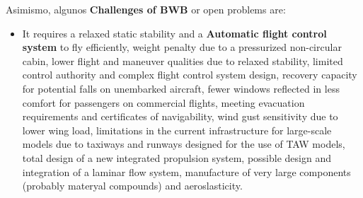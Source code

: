 %
Asimismo, algunos \textbf{Challenges of BWB} or open problems are:
\begin{itemize}
    \item It requires a relaxed static stability and a \textbf{Automatic flight control system} to fly efficiently, weight penalty due to a pressurized non-circular cabin, lower flight and maneuver qualities due to relaxed stability, limited control authority and complex flight control system design, recovery capacity for potential falls on unembarked aircraft, fewer windows reflected in less comfort for passengers on commercial flights, meeting evacuation requirements and certificates of navigability, wind gust sensitivity due to lower wing load, limitations in the current infrastructure for large-scale models due to taxiways and runways designed for the use of TAW models, total design of a new integrated propulsion system, possible design and integration of a laminar flow system, manufacture of very large components (probably materyal compounds) and aeroslasticity.
\end{itemize}

